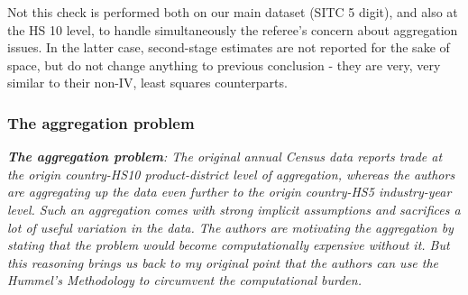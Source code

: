 \documentclass[a4paper,12pt]{article}
\begin{document}
Not this check is performed both on our main dataset (SITC 5 digit), and also at the HS 10 level, to handle simultaneously the referee's concern about aggregation issues. In the latter case, second-stage estimates are not reported for the sake of space, but do not change anything to previous conclusion - they are very, very similar to their non-IV, least squares counterparts.







\subsubsection{The aggregation problem}

\textit{\textbf{The aggregation problem}: The original annual Census data reports
trade at the origin country-HS10 product-district level of aggregation,
whereas the authors are aggregating up the data even further to the origin
country-HS5 industry-year level. Such an aggregation comes with strong implicit assumptions and sacrifices a lot of useful variation in the data.
The authors are motivating the aggregation by stating that the problem
would become computationally expensive without it. But this reasoning
brings us back to my original point that the authors can use the Hummel's
Methodology to circumvent the computational burden.}
\end{document}
